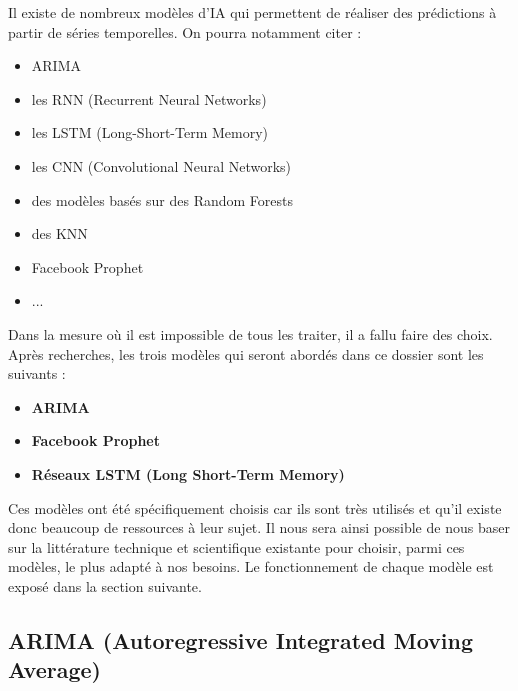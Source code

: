 \documentclass[french]{article}
\begin{document}
    Il existe de nombreux modèles d'IA qui permettent de réaliser des prédictions à partir de séries temporelles. On pourra notamment citer :
    \begin{itemize}
        \item ARIMA
        \item les RNN (Recurrent Neural Networks)
        \item les LSTM (Long-Short-Term Memory)
        \item les CNN (Convolutional Neural Networks)
        \item des modèles basés sur des Random Forests
        \item des KNN
        \item Facebook Prophet
        \item ...
    \end{itemize}
    
    Dans la mesure où il est impossible de tous les traiter, il a fallu faire des choix. Après recherches, les trois modèles qui seront abordés dans ce dossier sont les suivants :
    \begin{itemize}
        \item \textbf{ARIMA}
        \item \textbf{Facebook Prophet}
        \item \textbf{Réseaux LSTM (Long Short-Term Memory)}
    \end{itemize} 
    
    Ces modèles ont été spécifiquement choisis car ils sont très utilisés et qu'il existe donc beaucoup de ressources à leur sujet. Il nous sera ainsi possible de nous baser sur la littérature technique et scientifique existante pour choisir, parmi ces modèles, le plus adapté à nos besoins. Le fonctionnement de chaque modèle est exposé dans la section suivante.

    \subsection{ARIMA (Autoregressive Integrated Moving Average)}
\end{document}
